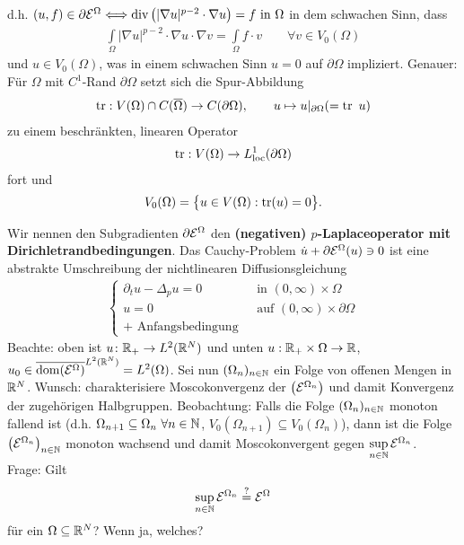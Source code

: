 d.h. $(u,f)\in\partial\mathcal{E}^\Omega
\Longleftrightarrow
\operatorname{div}\left(|\nabla u|^{p-2}\cdot\nabla u\right)=f\text{ in }\Omega$ 
in dem schwachen Sinn, dass
\begin{align*}
	\int\limits_\Omega|\nabla u|^{p-2}\cdot\nabla u\cdot\nabla v=\int\limits_\Omega f\cdot v\qquad\forall v\in V_0(\Omega)
\end{align*}
und $u\in V_0(\Omega)$, was in einem schwachen Sinn $u=0$ auf $\partial\Omega$ impliziert.
Genauer:\\ Für $\Omega$ mit $C^1$-Rand $\partial\Omega$ setzt sich die Spur-Abbildung
\begin{align*}
	\operatorname{tr}:V(\Omega)\cap C(\overline{\Omega})\to C(\partial\Omega),\qquad u\mapsto u|_{\partial\Omega}(=\operatorname{tr}~u)
\end{align*}
zu einem beschränkten, linearen Operator 
\begin{align*}
	\operatorname{tr}:V(\Omega)\to L_{\text{loc}}^1(\partial\Omega)
\end{align*}
fort und 
\begin{align*}
	V_0(\Omega)=\big\lbrace u\in V(\Omega):\operatorname{tr}(u)=0\big\rbrace.
\end{align*}

Wir nennen den Subgradienten $\partial\mathcal{E}^\Omega$ den \textbf{(negativen) $p$-Laplaceoperator mit Dirichletrandbedingungen}.
Das Cauchy-Problem $\dot{u}+\partial\mathcal{E}^\Omega(u)\ni 0$ ist eine abstrakte Umschreibung der nichtlinearen Diffusionsgleichung
\begin{align*}
	\left\lbrace\begin{array}{rl}
		\partial_t u-\Delta_p u=0&\text{ in }(0,\infty)\times\Omega\\
		u=0 &\text{ auf }(0,\infty)\times\partial\Omega\\
		\text{+ Anfangsbedingung }&
	\end{array}\right.	
\end{align*}
Beachte: oben ist $u\colon \mathbb{R}_+\to L^2(\mathbb{R}^N)$ und unten $u:\mathbb{R}_+\times\Omega\to\mathbb{R}$,\\ $u_0\in\overline{\operatorname{dom}(\mathcal{E}^\Omega)}^{L^2(\mathbb{R}^N)}=L^2(\Omega)$.\nl
Sei nun $(\Omega_n)_{n\in\mathbb{N}}$ ein Folge von offenen Mengen in $\mathbb{R}^N$.
Wunsch: charakterisiere Moscokonvergenz der $\big(\mathcal{E}^{\Omega_n}\big)$ und damit Konvergenz der zugehörigen Halbgruppen.\nl
Beobachtung:
Falls die Folge $(\Omega_n)_{n\in\mathbb{N}}$ monoton fallend ist 
(d.h. $\Omega_{n+1}\subseteq\Omega_n~\forall n\in\mathbb{N}$, $V_0(\Omega_{n+1})\subseteq V_0(\Omega_n)$), 
dann ist die Folge $\big(\mathcal{E}^{\Omega_n}\big)_{n\in\mathbb{N}}$ monoton wachsend und damit Moscokonvergent gegen $\sup\limits_{n\in\mathbb{N}}\mathcal{E}^{\Omega_n}$.\\
Frage: Gilt
\begin{align*}
	\sup\limits_{n\in\mathbb{N}}\mathcal{E}^{\Omega_n}\overset{?}{=}\mathcal{E}^\Omega
\end{align*}
für ein $\Omega\subseteq\mathbb{R}^N$? Wenn ja, welches?

